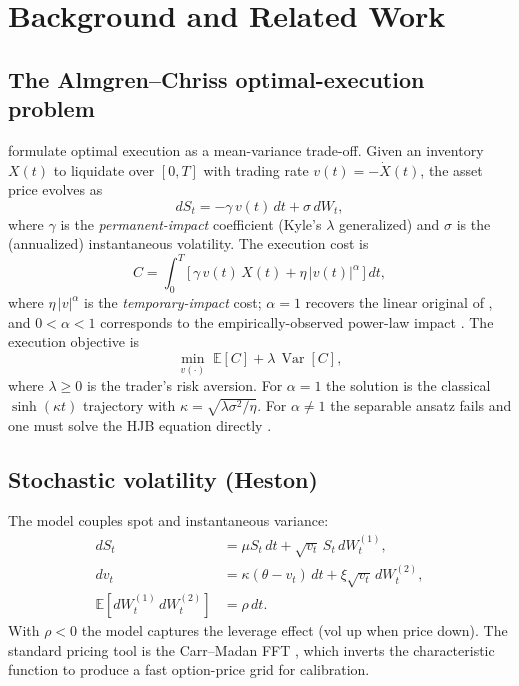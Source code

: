 \documentclass[11pt,letterpaper]{article}
\newcommand{\Vart}{\operatorname{Var}}
\newcommand{\E}{\mathbb{E}}
\begin{document}
\section{Background and Related Work}
\label{sec:background}

\subsection{The Almgren--Chriss optimal-execution problem}

\citet{almgren2001optimal} formulate optimal execution as a mean-variance trade-off. Given an inventory \(X(t)\) to liquidate over \([0,T]\) with trading rate \(v(t) = -\dot{X}(t)\), the asset price evolves as
\begin{equation}
\label{eq:price}
dS_t = -\gamma\, v(t)\, dt + \sigma\, dW_t,
\end{equation}
where \(\gamma\) is the \emph{permanent-impact} coefficient (Kyle's \(\lambda\) generalized) and \(\sigma\) is the (annualized) instantaneous volatility. The execution cost is
\begin{equation}
\label{eq:cost}
C = \int_0^T \big[\, \gamma\, v(t)\, X(t) + \eta\, |v(t)|^{\alpha}\, \big]\, dt,
\end{equation}
where \(\eta\, |v|^{\alpha}\) is the \emph{temporary-impact} cost; \(\alpha=1\) recovers the linear original of \citet{almgren2001optimal}, and \(0<\alpha<1\) corresponds to the empirically-observed power-law impact \citep{almgren2003optimal,gatheral2010no}. The execution objective is
\begin{equation}
\label{eq:obj}
\min_{v(\cdot)}\; \E[C] + \lambda\, \Vart[C],
\end{equation}
where \(\lambda\geq 0\) is the trader's risk aversion. For \(\alpha=1\) the solution is the classical \(\sinh(\kappa t)\) trajectory with \(\kappa = \sqrt{\lambda\sigma^2/\eta}\). For \(\alpha\neq 1\) the separable ansatz fails and one must solve the HJB equation directly \citep{schied2010optimal}.

\subsection{Stochastic volatility (Heston)}

The \citet{heston1993closed} model couples spot and instantaneous variance:
\begin{align}
\label{eq:heston}
dS_t &= \mu S_t\, dt + \sqrt{v_t}\, S_t\, dW_t^{(1)},\\
dv_t &= \kappa(\theta - v_t)\, dt + \xi\sqrt{v_t}\, dW_t^{(2)},\\
\E[dW^{(1)}_t\, dW^{(2)}_t] &= \rho\, dt.
\end{align}
With \(\rho<0\) the model captures the leverage effect (vol up when price down). The standard pricing tool is the Carr--Madan FFT \citep{carr1999option}, which inverts the characteristic function to produce a fast option-price grid for calibration.
\end{document}
